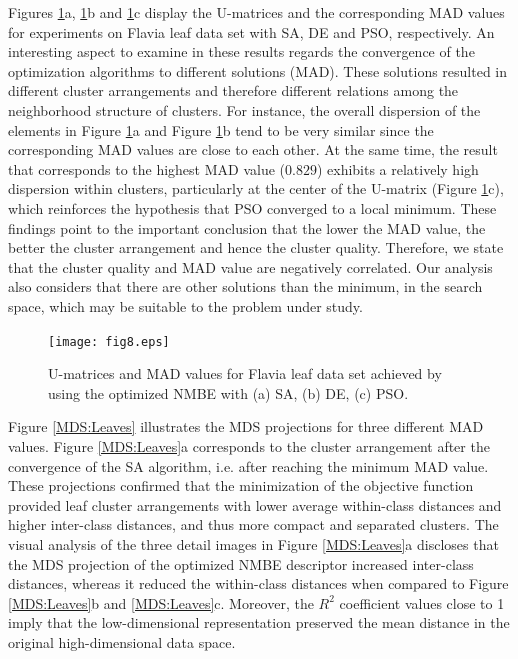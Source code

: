 {{Figures \ref{fig:MatrizU_leaves_II}a, \ref{fig:MatrizU_leaves_II}b and \ref{fig:MatrizU_leaves_II}c display the U-matrices and the corresponding MAD values for experiments on Flavia leaf data set with SA, DE and PSO, respectively. An interesting aspect to examine in these results regards the convergence of the optimization algorithms to different solutions (MAD). These solutions resulted in different cluster arrangements and therefore different relations among the neighborhood structure of clusters. For instance, the overall dispersion  of the elements in Figure \ref{fig:MatrizU_leaves_II}a and Figure \ref{fig:MatrizU_leaves_II}b tend to be very similar since  the corresponding MAD values are close to each other. At the same time, the result that corresponds to the highest MAD value ($0.829$) exhibits a relatively high dispersion within clusters, particularly at the center of the U-matrix (Figure \ref{fig:MatrizU_leaves_II}c), which reinforces the hypothesis that  PSO converged to a local minimum. These findings point to the important conclusion that the lower the MAD value, the better the cluster arrangement and hence the cluster quality. Therefore, we state that the cluster quality and MAD value are negatively correlated. Our analysis also considers that there are other solutions than the minimum, in the search space, which may be suitable to the problem under study. 

\begin{figure}[h!]
\centering
\texttt{[image: fig8.eps]}
 \caption{\label{fig:MatrizU_leaves_II}U-matrices and MAD values for Flavia leaf data set achieved by using  the optimized NMBE with (a) SA, (b) DE, (c) PSO.}
\end{figure}

Figure \ref{MDS:Leaves} illustrates the MDS projections for three different MAD values. Figure \ref{MDS:Leaves}a corresponds to the cluster arrangement after the convergence of the SA algorithm, i.e. after reaching the minimum MAD value. These projections confirmed that the minimization of the objective function provided leaf cluster arrangements with lower average within-class distances and higher inter-class distances, and thus  more compact and separated clusters. The visual analysis of the three detail images in Figure \ref{MDS:Leaves}a discloses that the MDS projection of the optimized NMBE descriptor increased inter-class distances, whereas it reduced the within-class distances when compared to Figure \ref{MDS:Leaves}b and \ref{MDS:Leaves}c. Moreover, the $R^2$ coefficient values close to 1 imply that the low-dimensional representation preserved the mean distance in the original high-dimensional data space.

}}
